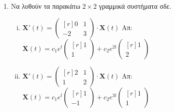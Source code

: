 


\pagestyle{askhseis}



\begin{center}
  \minibox{\large \bfseries \textcolor{Col1}{Ασκήσεις στα Γραμμικά Συστήματα ΣΔΕ
  (Ομογενή)}}
\end{center}

\vspace{\baselineskip}


\begin{enumerate}

  \item Να λυθούν τα παρακάτω $ 2 \times 2 $ γραμμικά συστήματα σδε.

    \begin{enumerate}[i)]

      \item $ \mathbf{X}'(t) = 
        \begin{pmatrix*}[r]
          0 & 1 \\
          -2 & 3
        \end{pmatrix*} \cdot 
        \mathbf{X}(t) $
        \hfill Απ: {\scriptsize $ \mathbf{X}(t) = c_{1}e^{t} 
          \begin{pmatrix*}[r] 1 \\ 1 \end{pmatrix*} + c_{2}e^{2t} 
        \begin{pmatrix*}[r] 1 \\ 2 \end{pmatrix*} $} 

      \item $ \mathbf{X}'(t) = 
        \begin{pmatrix*}[r]
          2 & 1 \\
          1 & 2
        \end{pmatrix*} \cdot 
        \mathbf{X}(t) $
        \hfill Απ: {\scriptsize $ \mathbf{X}(t) = c_{1}e^{t} 
          \begin{pmatrix*}[r] 1 \\ -1 \end{pmatrix*} + c_{2}e^{3t} 
        \begin{pmatrix*}[r] 1 \\ 1 \end{pmatrix*} $} 


\end{enumerate}
\end{enumerate}
